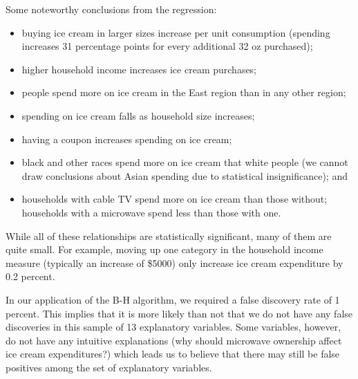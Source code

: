 \documentclass[11pt, fleqn]{article}
\begin{document}
Some noteworthy conclusions from the regression:
\begin{itemize}
  \item buying ice cream in larger sizes increase per unit consumption (spending increases 31 percentage points for every additional 32 oz purchased);
  \item higher household income increases ice cream purchases;
  \item people spend more on ice cream in the East region than in any other region;
  \item spending on ice cream falls as household size increases;
  \item having a coupon increases spending on ice cream;
  \item black and other races spend more on ice cream that white people (we cannot draw conclusions about Asian spending due to statistical insignificance); and
  \item households with cable TV spend more on ice cream than those without; households with a microwave spend less than those with one.
\end{itemize}

While all of these relationships are statistically significant, many of them are quite small. For example, moving up one category in the household income measure (typically an increase of \$5000) only increase ice cream expenditure by 0.2 percent.

In our application of the B-H algorithm, we required a false discovery rate of 1 percent. This implies that it is more likely than not that we do not have any false discoveries in this sample of 13 explanatory variables. Some variables, however, do not have any intuitive explanations (why should microwave ownership affect ice cream expenditures?) which leads us to believe that there may still be false positives among the set of explanatory variables.
\end{document}
